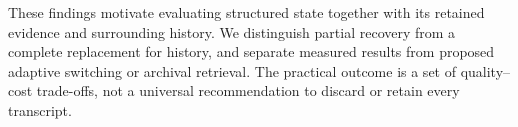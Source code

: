 These findings motivate evaluating structured state together with its
retained evidence and surrounding history. We distinguish partial recovery from a complete
replacement for history, and separate measured results from proposed
adaptive switching or archival retrieval. The practical outcome is a set
of quality--cost trade-offs, not a universal recommendation to discard or
retain every transcript.
